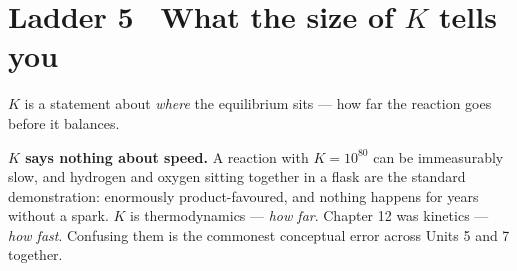 \documentclass{apchem-worksheet}
\begin{document}
\section*{\sffamily Ladder 5 \textbullet\ What the size of $K$ tells you}

$K$ is a statement about \emph{where} the equilibrium sits --- how far
the reaction goes before it balances.

\begin{center}
\end{center}

\begin{apctrap}
\textbf{$K$ says nothing about speed.} A reaction with $K = 10^{80}$ can
be immeasurably slow, and hydrogen and oxygen sitting together in a
flask are the standard demonstration: enormously product-favoured, and
nothing happens for years without a spark. $K$ is thermodynamics ---
\emph{how far}. Chapter 12 was kinetics --- \emph{how fast}. Confusing
them is the commonest conceptual error across Units 5 and 7 together.
\end{apctrap}
\end{document}
